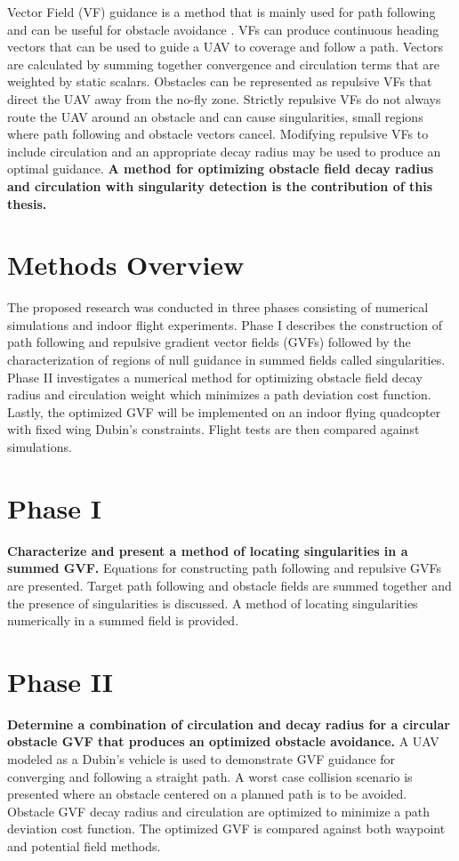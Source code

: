 \documentclass[numbered,pdftex]{ohio-etd}
\begin{document}
 

Vector Field (VF) guidance is a method that is mainly used for path following and can be useful for obstacle avoidance \cite{panagou_motion_2014,wilhelm_2019}. VFs can produce continuous heading vectors that can be used to guide a UAV to coverage and follow a path. Vectors are calculated by summing together convergence and circulation terms that are weighted by static scalars. Obstacles can be represented as repulsive VFs that direct the UAV away from the no-fly zone. Strictly repulsive VFs do not always route the UAV around an obstacle and can cause singularities, small regions where path following and obstacle vectors cancel. Modifying repulsive VFs to include circulation and an appropriate decay radius may be used to produce an optimal guidance. \textbf{A method for optimizing obstacle field decay radius and circulation with singularity detection is the contribution of this thesis.}
 \pagebreak
 
 \section{Methods Overview}
 
 The proposed research was conducted in three phases consisting of numerical simulations and indoor flight experiments. Phase I describes the construction of path following and repulsive gradient vector fields (GVFs) followed by the characterization of regions of null guidance in summed fields called singularities. Phase II investigates a numerical method for optimizing obstacle field decay radius and circulation weight which minimizes a path deviation cost function. Lastly, the optimized GVF will be implemented on an indoor flying quadcopter with fixed wing Dubin's constraints. Flight tests are then compared against simulations.
 

 \section{Phase I}
 \textbf{Characterize and present a method of locating singularities in a summed GVF.}  Equations for constructing path following and repulsive GVFs are presented. Target path following and obstacle fields are summed together and the presence of singularities is discussed. A method of locating singularities numerically in a summed field is provided.
 
 
 
 \section{Phase II}
 \textbf{Determine a combination of circulation and decay radius for a circular obstacle GVF that produces an optimized obstacle avoidance.} A UAV modeled as a Dubin's vehicle is used to demonstrate GVF guidance for converging and following a straight path. A worst case collision scenario is presented where an obstacle centered on a planned path is to be avoided. Obstacle GVF decay radius and circulation are optimized to minimize a path deviation cost function. The optimized GVF is compared against both waypoint and potential field methods. 
 
\end{document}
